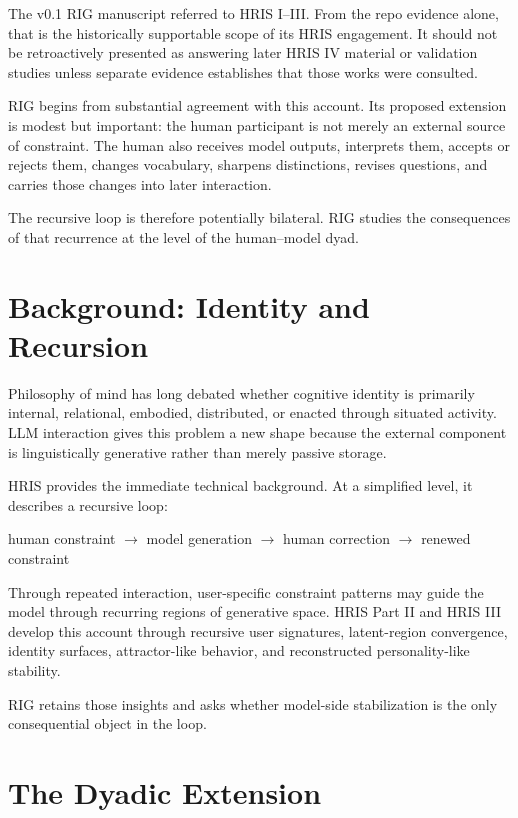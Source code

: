 \documentclass[12pt]{article}
\begin{document}
The v0.1 RIG manuscript referred to HRIS I--III. From the repo evidence alone, that is the historically supportable scope of its HRIS engagement. It should not be retroactively presented as answering later HRIS IV material or validation studies unless separate evidence establishes that those works were consulted.

RIG begins from substantial agreement with this account. Its proposed extension is modest but important: the human participant is not merely an external source of constraint. The human also receives model outputs, interprets them, accepts or rejects them, changes vocabulary, sharpens distinctions, revises questions, and carries those changes into later interaction.

The recursive loop is therefore potentially bilateral. RIG studies the consequences of that recurrence at the level of the human--model dyad.

\section{Background: Identity and Recursion}

Philosophy of mind has long debated whether cognitive identity is primarily internal, relational, embodied, distributed, or enacted through situated activity. LLM interaction gives this problem a new shape because the external component is linguistically generative rather than merely passive storage.

HRIS provides the immediate technical background. At a simplified level, it describes a recursive loop:

\begin{center}
human constraint $\rightarrow$ model generation $\rightarrow$ human correction $\rightarrow$ renewed constraint
\end{center}

Through repeated interaction, user-specific constraint patterns may guide the model through recurring regions of generative space. HRIS Part II and HRIS III develop this account through recursive user signatures, latent-region convergence, identity surfaces, attractor-like behavior, and reconstructed personality-like stability.

RIG retains those insights and asks whether model-side stabilization is the only consequential object in the loop.

\section{The Dyadic Extension}
\end{document}
